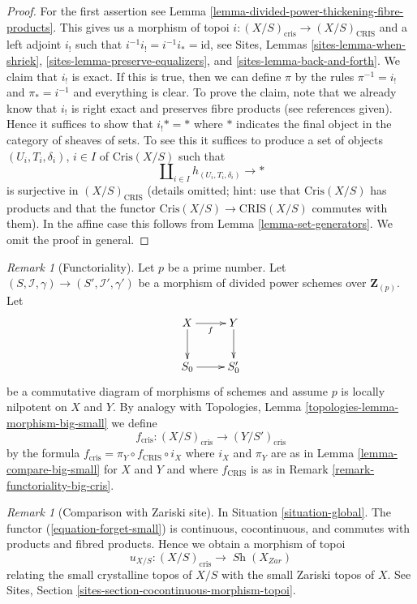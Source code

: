 \documentclass{stacks-project}
\theoremstyle{plain}
\theoremstyle{definition}
\theoremstyle{remark}
\newtheorem{remark}[subsection]{Remark}
\numberwithin{equation}{subsection}
\def\Sh{\mathop{\mathit{Sh}}\nolimits}
\begin{document}
\begin{proof}
For the first assertion see
Lemma \ref{lemma-divided-power-thickening-fibre-products}.
This gives us a morphism of topoi
$i : (X/S)_{\text{cris}} \to (X/S)_{\text{CRIS}}$ and a left adjoint
$i_!$ such that $i^{-1}i_! = i^{-1}i_* = \text{id}$, see
Sites, Lemmas \ref{sites-lemma-when-shriek},
\ref{sites-lemma-preserve-equalizers}, and
\ref{sites-lemma-back-and-forth}.
We claim that $i_!$ is exact. If this is true, then we can define
$\pi$ by the rules $\pi^{-1} = i_!$ and $\pi_* = i^{-1}$
and everything is clear. To prove the claim, note that we already know
that $i_!$ is right exact and preserves fibre products (see references
given). Hence it suffices to show that $i_! * = *$ where $*$ indicates
the final object in the category of sheaves of sets. 
To see this it suffices to produce a set of objects
$(U_i, T_i, \delta_i)$, $i \in I$ of $\text{Cris}(X/S)$ such that
$$
\coprod\nolimits_{i \in I} h_{(U_i, T_i, \delta_i)} \to *
$$
is surjective in $(X/S)_{\text{CRIS}}$ (details omitted; hint: use that
$\text{Cris}(X/S)$ has products and that the functor
$\text{Cris}(X/S) \to \text{CRIS}(X/S)$ commutes with them).
In the affine case this
follows from Lemma \ref{lemma-set-generators}. We omit the proof
in general.
\end{proof}

\begin{remark}[Functoriality]
\label{remark-functoriality-cris}
Let $p$ be a prime number.
Let $(S, \mathcal{I}, \gamma) \to (S', \mathcal{I}', \gamma')$
be a morphism of divided power schemes over $\mathbf{Z}_{(p)}$.
Let
$$
\xymatrix{
X \ar[r]_f \ar[d] & Y \ar[d] \\
S_0 \ar[r] & S'_0
}
$$
be a commutative diagram of morphisms of schemes and assume $p$ is
locally nilpotent on $X$ and $Y$. By analogy with
Topologies, Lemma \ref{topologies-lemma-morphism-big-small} we define
$$
f_{\text{cris}} : (X/S)_{\text{cris}} \longrightarrow (Y/S')_{\text{cris}}
$$
by the formula $f_{\text{cris}} = \pi_Y \circ f_{\text{CRIS}} \circ i_X$
where $i_X$ and $\pi_Y$ are as in Lemma \ref{lemma-compare-big-small}
for $X$ and $Y$ and where $f_{\text{CRIS}}$ is as in
Remark \ref{remark-functoriality-big-cris}.
\end{remark}

\begin{remark}[Comparison with Zariski site]
\label{remark-compare-zariski}
In Situation \ref{situation-global}.
The functor (\ref{equation-forget-small}) is continuous, cocontinuous, and
commutes with products and fibred products.
Hence we obtain a morphism of topoi
$$
u_{X/S} : (X/S)_{\text{cris}} \longrightarrow \Sh(X_{Zar})
$$
relating the small crystalline topos of $X/S$ with
the small Zariski topos of $X$.
See Sites, Section \ref{sites-section-cocontinuous-morphism-topoi}.
\end{remark}
\end{document}
